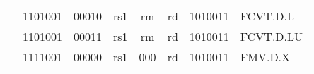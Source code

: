 \begin{table}[p]
\begin{small}
\begin{center}
\begin{tabular}{p{0in}p{0.4in}p{0.05in}p{0.05in}p{0.05in}p{0.05in}p{0.4in}p{0.6in}p{0.4in}p{0.6in}p{0.7in}l}
&
\multicolumn{4}{|c|}{1101001} &
\multicolumn{2}{c|}{00010} &
\multicolumn{1}{c|}{rs1} &
\multicolumn{1}{c|}{rm} &
\multicolumn{1}{c|}{rd} &
\multicolumn{1}{c|}{1010011} & FCVT.D.L \\
\cline{2-11}
  

&
\multicolumn{4}{|c|}{1101001} &
\multicolumn{2}{c|}{00011} &
\multicolumn{1}{c|}{rs1} &
\multicolumn{1}{c|}{rm} &
\multicolumn{1}{c|}{rd} &
\multicolumn{1}{c|}{1010011} & FCVT.D.LU \\
\cline{2-11}
  

&
\multicolumn{4}{|c|}{1111001} &
\multicolumn{2}{c|}{00000} &
\multicolumn{1}{c|}{rs1} &
\multicolumn{1}{c|}{000} &
\multicolumn{1}{c|}{rd} &
\multicolumn{1}{c|}{1010011} & FMV.D.X \\
\cline{2-11}
  

\end{tabular}
\end{center}
\end{small}

\end{table}
  

\newpage

